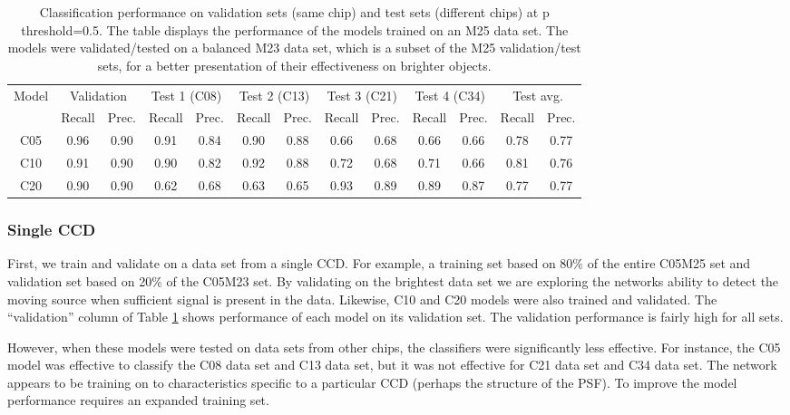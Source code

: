 \setlength{\tabcolsep}{3pt}
\begin{table}
  \label{tab:Single Chip}
  \caption{Classification performance on validation sets (same chip) and test sets (different chips) at p threshold=0.5.
  The table displays the performance of the models trained on an M25 data set.
  The models were validated/tested on a balanced M23 data set, which is a subset of the M25 validation/test sets, for a better presentation of their effectiveness on brighter objects.}
   \begin{tabular}{c|cc|cc|cc|cc|cc|cc}
  \multicolumn{1}{c|}{Model} & \multicolumn{2}{c|}{Validation} & \multicolumn{2}{c}{Test 1 (C08)}& \multicolumn{2}{c}{Test 2 (C13)}& \multicolumn{2}{c}{Test 3 (C21)}& \multicolumn{2}{c}{Test 4 (C34)}& \multicolumn{2}{c}{Test avg.} \\
   & Recall & Prec. & Recall & Prec. & Recall & Prec. & Recall & Prec. & Recall & Prec.& Recall & Prec. \\
    C05&0.96&0.90&0.91&0.84 &0.90&0.88 &0.66&0.68 &0.66&0.66&0.78&0.77\\
    C10&0.91& 0.90&0.90&0.82 &0.92&0.88 &0.72&0.68 &0.71&0.66&0.81&0.76\\
    C20&0.90& 0.90&0.62&0.68 &0.63&0.65 &0.93&0.89 &0.89&0.87&0.77&0.77
  \end{tabular}
\end{table}

\subsubsection{Single CCD}\label{subsubsect:SingleCCDandMultipleCCDs}

First, we train and validate on a data set from a single CCD. For example, a training set based on 80\% of the entire C05M25 set and validation set based on 20\% of the C05M23 set.
By validating on the brightest data set we are exploring the networks ability to detect the moving source when sufficient signal is present in the data. 
Likewise, C10 and C20 models were also trained and validated. 
The ``validation'' column of Table \ref{tab:Single Chip} shows performance of each model on its validation set. 
The validation performance is fairly high for all sets.

However, when these models were tested on data sets from other chips, the classifiers were significantly less effective. 
For instance, the C05 model was effective to classify the C08 data set and C13 data set, but it was not effective for C21 data set and C34 data set. 
The network appears to be training on to characteristics specific to a particular CCD (perhaps the structure of the PSF).  
To improve the model performance requires an expanded training set.


